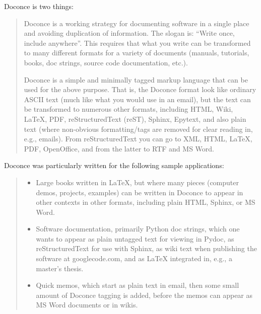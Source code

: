 \documentclass[a4paper,english]{article}
\begin{document}
Doconce is two things:
%
\begin{quote}
\begin{list}{.}
{
\setlength{\rightmargin}{\leftmargin}
}

\item Doconce is a working strategy for documenting software in a single
place and avoiding duplication of information. The slogan is:
``Write once, include anywhere''. This requires that what you write
can be transformed to many different formats for a variety of
documents (manuals, tutorials, books, doc strings, source code
documentation, etc.).

\item Doconce is a simple and minimally tagged markup language that can
be used for the above purpose. That is, the Doconce format look
like ordinary ASCII text (much like what you would use in an
email), but the text can be transformed to numerous other formats,
including HTML, Wiki, LaTeX, PDF, reStructuredText (reST), Sphinx,
Epytext, and also plain text (where non-obvious formatting/tags are
removed for clear reading in, e.g., emails). From reStructuredText
you can go to XML, HTML, LaTeX, PDF, OpenOffice, and from the
latter to RTF and MS Word.
\end{list}

\end{quote}

Doconce was particularly written for the following sample applications:
%
\begin{quote}
%
\begin{itemize}

\item Large books written in LaTeX, but where many pieces (computer demos,
projects, examples) can be written in Doconce to appear in other
contexts in other formats, including plain HTML, Sphinx, or MS Word.

\item Software documentation, primarily Python doc strings, which one wants
to appear as plain untagged text for viewing in Pydoc, as reStructuredText
for use with Sphinx, as wiki text when publishing the software at
googlecode.com, and as LaTeX integrated in, e.g., a master's thesis.

\item Quick memos, which start as plain text in email, then some small
amount of Doconce tagging is added, before the memos can appear as
MS Word documents or in wikis.

\end{itemize}

\end{quote}
\end{document}
